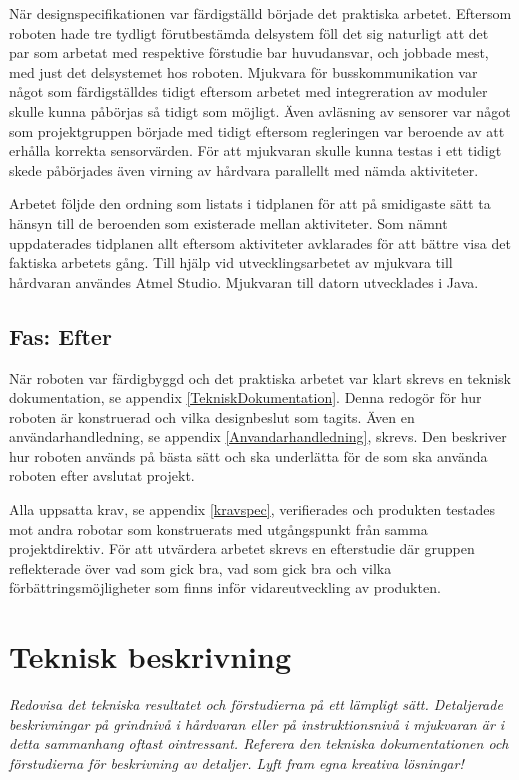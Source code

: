 \documentclass[11pt]{article}
\begin{document}
\begin{flushleft}
När designspecifikationen var färdigställd började det praktiska arbetet. Eftersom roboten hade tre tydligt förutbestämda delsystem föll det sig naturligt att det par som arbetat med respektive förstudie bar huvudansvar, och jobbade mest, med just det delsystemet hos roboten. Mjukvara för busskommunikation var något som färdigställdes tidigt eftersom arbetet med integreration av moduler skulle kunna påbörjas så tidigt som möjligt. Även avläsning av sensorer var något som projektgruppen började med tidigt eftersom regleringen var beroende av att erhålla korrekta sensorvärden. För att mjukvaran skulle kunna testas i ett tidigt skede påbörjades även virning av hårdvara parallellt med nämda aktiviteter. 

Arbetet följde den ordning som listats i tidplanen för att på smidigaste sätt ta hänsyn till de beroenden som existerade mellan aktiviteter. Som nämnt uppdaterades tidplanen allt eftersom aktiviteter avklarades för att bättre visa det faktiska arbetets gång. Till hjälp vid utvecklingsarbetet av mjukvara till hårdvaran användes Atmel Studio. Mjukvaran till datorn utvecklades i Java. 

\subsection{Fas: Efter}
När roboten var färdigbyggd och det praktiska arbetet var klart skrevs en teknisk dokumentation, se appendix \ref{TekniskDokumentation}. Denna redogör för hur roboten är konstruerad och vilka designbeslut som tagits. Även en användarhandledning, se appendix \ref{Anvandarhandledning}, skrevs. Den beskriver hur roboten används på bästa sätt och ska underlätta för de som ska använda roboten efter avslutat projekt.

Alla uppsatta krav, se appendix \ref{kravspec}, verifierades och produkten testades mot andra robotar som konstruerats med utgångspunkt från samma projektdirektiv. För att utvärdera arbetet skrevs en efterstudie där gruppen reflekterade över vad som gick bra, vad som gick bra och vilka förbättringsmöjligheter som finns inför vidareutveckling av produkten.

\pagebreak

\section{Teknisk beskrivning}
\textit{Redovisa det tekniska resultatet och förstudierna på ett lämpligt sätt. Detaljerade beskrivningar på grindnivå i hårdvaran eller på instruktionsnivå i mjukvaran är i detta sammanhang oftast ointressant. Referera den tekniska dokumentationen och förstudierna för beskrivning av detaljer. Lyft fram egna kreativa lösningar!}


\end{flushleft}
\end{document}
